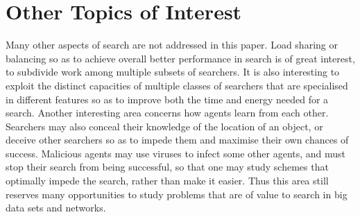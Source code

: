\documentclass[journal]{IEEEtran}
\begin{document}
\section{Other Topics of Interest}

Many other aspects of search are not addressed in this paper. Load sharing or balancing so as to achieve overall better performance in search is of great interest, to subdivide work among multiple subsets of searchers. It is also interesting to exploit the distinct capacities of multiple classes of searchers that are specialised in different features so as to improve both the time and energy needed for a search.
Another interesting area concerns how agents learn from each other. Searchers may also  conceal their knowledge of the location of an object, or deceive other searchers so as to impede them and maximise their own chances of success. Malicious agents may use viruses \cite{Viruses} to infect some other agents, and must stop their search from being successful, so that one may study schemes that optimally impede the search, rather than make it easier.
Thus this area still reserves many opportunities to study problems that are of value to search in big data sets and networks.
\end{document}
